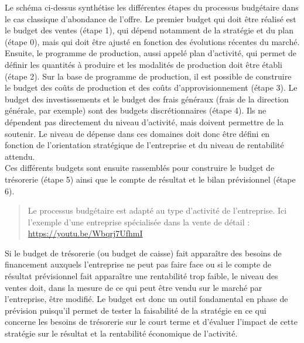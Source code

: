 \documentclass{tufte-handout}
\begin{document}
Le schéma ci-dessus synthétise les différentes étapes du processus budgétaire dans le cas classique d'abondance de l'offre. Le premier budget qui doit être réalisé est le budget des ventes (étape 1), qui dépend notamment de la stratégie et du plan (étape 0), mais qui doit être ajusté en fonction des évolutions récentes du marché. Ensuite, le programme de production, aussi appelé plan d'activité, qui permet de définir les quantités à produire et les modalités de production doit être établi (étape 2). Sur la base de programme de production, il est possible de construire le budget des coûts de production et des coûts d'approvisionnement (étape 3). Le budget des investissements et le budget des frais généraux (frais de la direction générale, par exemple) sont des budgets discrétionnaires (étape 4). Ils ne dépendent pas directement du niveau d'activité, mais doivent permettre de la soutenir. Le niveau de dépense dans ces domaines doit donc être défini en fonction de l'orientation stratégique de l'entreprise et du niveau de rentabilité attendu.\\
Ces différents budgets sont ensuite rassemblés pour construire le budget de trésorerie (étape 5) ainsi que le compte de résultat et le bilan prévisionnel (étape 6).\\

\begin{quote}
Le processus budgétaire est adapté au type d'activité de l'entreprise. Ici l'exemple d'une entreprise spécialisée dans la vente de détail :\\
\url{https://youtu.be/Wbqrj7UfhmI}\\
\end{quote}

Si le budget de trésorerie (ou budget de caisse) fait apparaître des besoins de financement auxquels l'entreprise ne peut pas faire face ou si le compte de résultat prévisionnel fait apparaître une rentabilité trop faible, le niveau des ventes doit, dans la mesure de ce qui peut être vendu sur le marché par l'entreprise, être modifié. Le budget est donc un outil fondamental en phase de prévision puisqu'il permet de tester la faisabilité de la stratégie en ce qui concerne les besoins de trésorerie sur le court terme et d'évaluer l'impact de cette stratégie sur le résultat et la rentabilité économique de l'activité.\\
\end{document}
